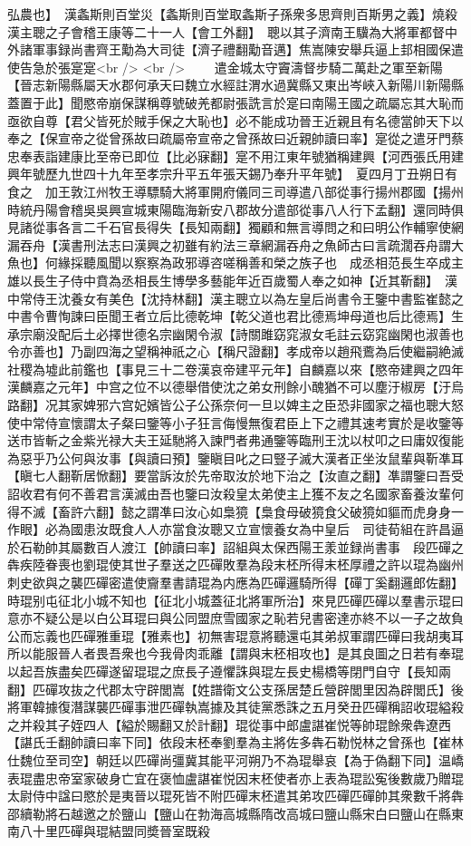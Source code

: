 弘農也】　漢螽斯則百堂災【螽斯則百堂取螽斯子孫衆多思齊則百斯男之義】燒殺漢主聰之子會稽王康等二十一人【會工外翻】　聰以其子濟南王驥為大將軍都督中外諸軍事録尚書齊王勱為大司徒【濟子禮翻勱音邁】焦嵩陳安舉兵逼上邽相國保遣使告急於張寔寔<br />
<br />
　　遣金城太守竇濤督步騎二萬赴之軍至新陽【晉志新陽縣屬天水郡何承天曰魏立水經註渭水過冀縣又東出岑峽入新陽川新陽縣蓋置于此】聞愍帝崩保謀稱尊號破羌都尉張詵言於寔曰南陽王國之疏屬忘其大恥而亟欲自尊【君父皆死於賊手保之大恥也】必不能成功晉王近親且有名德當帥天下以奉之【保宣帝之從曾孫故曰疏屬帝宣帝之曾孫故曰近親帥讀曰率】寔從之遣牙門蔡忠奉表詣建康比至帝已即位【比必寐翻】寔不用江東年號猶稱建興【河西張氏用建興年號歷九世四十九年至孝宗升平五年張天錫乃奉升平年號】　夏四月丁丑朔日有食之　加王敦江州牧王導驃騎大將軍開府儀同三司導遣八部從事行揚州郡國【揚州時統丹陽會稽吳吳興宣城東陽臨海新安八郡故分遣部從事八人行下孟翻】還同時俱見諸從事各言二千石官長得失【長知兩翻】獨顧和無言導問之和曰明公作輔寧使網漏吞舟【漢書刑法志曰漢興之初雖有約法三章網漏吞舟之魚師古曰言疏濶吞舟謂大魚也】何緣採聽風聞以察察為政邪導咨嗟稱善和榮之族子也　成丞相范長生卒成主雄以長生子侍中賁為丞相長生博學多藝能年近百歲蜀人奉之如神【近其靳翻】　漢中常侍王沈養女有美色【沈持林翻】漢主聰立以為左皇后尚書令王鑒中書監崔懿之中書令曹恂諫曰臣聞王者立后比德乾坤【乾父道也君比德焉坤母道也后比德焉】生承宗廟没配后土必擇世德名宗幽閑令淑【詩關雎窈窕淑女毛註云窈窕幽閑也淑善也令亦善也】乃副四海之望稱神祇之心【稱尺證翻】孝成帝以趙飛鷰為后使繼嗣絶滅社稷為墟此前鑑也【事見三十二卷漢哀帝建平元年】自麟嘉以來【愍帝建興之四年漢麟嘉之元年】中宫之位不以德舉借使沈之弟女刑餘小醜猶不可以塵汙椒房【汙烏路翻】况其家婢邪六宫妃嬪皆公子公孫奈何一旦以婢主之臣恐非國家之福也聰大怒使中常侍宣懷謂太子粲曰鑒等小子狂言侮慢無復君臣上下之禮其速考實於是收鑒等送市皆斬之金紫光禄大夫王延馳將入諫門者弗通鑒等臨刑王沈以杖叩之曰庸奴復能為惡乎乃公何與汝事【與讀曰預】鑒瞋目叱之曰豎子滅大漢者正坐汝鼠輩與靳凖耳【瞋七人翻靳居惞翻】要當訴汝於先帝取汝於地下治之【汝直之翻】凖謂鑒曰吾受詔收君有何不善君言漢滅由吾也鑒曰汝殺皇太弟使主上獲不友之名國家畜養汝輩何得不滅【畜許六翻】懿之謂凖曰汝心如梟獍【梟食母破獍食父破獍如貙而虎身身一作眼】必為國患汝既食人人亦當食汝聰又立宣懷養女為中皇后　司徒荀組在許昌逼於石勒帥其屬數百人渡江【帥讀曰率】詔組與太保西陽王羕並録尚書事　段匹磾之犇疾陸眷喪也劉琨使其世子羣送之匹磾敗羣為段末柸所得末柸厚禮之許以琨為幽州刺史欲與之襲匹磾密遣使齎羣書請琨為内應為匹磾邏騎所得【磾丁奚翻邏郎佐翻】時琨别屯征北小城不知也【征北小城蓋征北將軍所治】來見匹磾匹磾以羣書示琨曰意亦不疑公是以白公耳琨曰與公同盟庶雪國家之恥若兒書密達亦終不以一子之故負公而忘義也匹磾雅重琨【雅素也】初無害琨意將聽還屯其弟叔軍謂匹磾曰我胡夷耳所以能服晉人者畏吾衆也今我骨肉乖離【謂與末柸相攻也】是其良圖之日若有奉琨以起吾族盡矣匹磾遂留琨琨之庶長子遵懼誅與琨左長史楊橋等閉門自守【長知兩翻】匹磾攻抜之代郡太守辟閭嵩【姓譜衛文公支孫居楚丘營辟閭里因為辟閭氏】後將軍韓據復潛謀襲匹磾事泄匹磾執嵩據及其徒黨悉誅之五月癸丑匹磾稱詔收琨縊殺之并殺其子姪四人【縊於賜翻又於計翻】琨從事中郎盧諶崔悦等帥琨餘衆犇遼西【諶氏壬翻帥讀曰率下同】依段末柸奉劉羣為主將佐多犇石勒悦林之曾孫也【崔林仕魏位至司空】朝廷以匹磾尚彊冀其能平河朔乃不為琨舉哀【為于偽翻下同】温嶠表琨盡忠帝室家破身亡宜在褒恤盧諶崔悦因末柸使者亦上表為琨訟寃後數歲乃贈琨太尉侍中諡曰愍於是夷晉以琨死皆不附匹磾末柸遣其弟攻匹磾匹磾帥其衆數千將犇邵續勒將石越邀之於鹽山【鹽山在勃海高城縣隋改高城曰鹽山縣宋白曰鹽山在縣東南八十里匹磾與琨結盟同奬晉室既殺